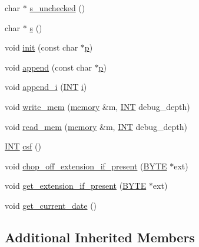 \begin{DoxyCompactItemize}
\item 
char $\ast$ \mbox{\hyperlink{classhollerith_a4b549f6a27d3d9d1c3d9b4eba91b5895}{s\+\_\+unchecked}} ()
\item 
char $\ast$ \mbox{\hyperlink{classhollerith_af61fce2d06f211b25fe3838e4dfee77a}{s}} ()
\item 
void \mbox{\hyperlink{classhollerith_af51ae7b943056db367f3c205a5a1cc4b}{init}} (const char $\ast$\mbox{\hyperlink{alphabet2_8_c_a533391314665d6bf1b5575e9a9cd8552}{p}})
\item 
void \mbox{\hyperlink{classhollerith_a778dd63885a4e3a4e2fb829165c32632}{append}} (const char $\ast$\mbox{\hyperlink{alphabet2_8_c_a533391314665d6bf1b5575e9a9cd8552}{p}})
\item 
void \mbox{\hyperlink{classhollerith_a5df988b4cf3eb66b5645115abeab5782}{append\+\_\+i}} (\mbox{\hyperlink{galois_8h_a09fddde158a3a20bd2dcadb609de11dc}{I\+NT}} \mbox{\hyperlink{alphabet2_8_c_acb559820d9ca11295b4500f179ef6392}{i}})
\item 
void \mbox{\hyperlink{classhollerith_a8d17739da6b15b91053f8356b824407d}{write\+\_\+mem}} (\mbox{\hyperlink{classmemory}{memory}} \&m, \mbox{\hyperlink{galois_8h_a09fddde158a3a20bd2dcadb609de11dc}{I\+NT}} debug\+\_\+depth)
\item 
void \mbox{\hyperlink{classhollerith_af6cbbe5728658ff3a71fc9fe331bb39f}{read\+\_\+mem}} (\mbox{\hyperlink{classmemory}{memory}} \&m, \mbox{\hyperlink{galois_8h_a09fddde158a3a20bd2dcadb609de11dc}{I\+NT}} debug\+\_\+depth)
\item 
\mbox{\hyperlink{galois_8h_a09fddde158a3a20bd2dcadb609de11dc}{I\+NT}} \mbox{\hyperlink{classhollerith_ac3e7f35e2c6d82a9825297577e1011ba}{csf}} ()
\item 
void \mbox{\hyperlink{classhollerith_a17d5710f02f7f230f2646497f5b267e7}{chop\+\_\+off\+\_\+extension\+\_\+if\+\_\+present}} (\mbox{\hyperlink{galois_8h_ab6cc7b4aeb6ea31aba2b3fbfc83ff5e6}{B\+Y\+TE}} $\ast$ext)
\item 
void \mbox{\hyperlink{classhollerith_a530576f22e7f0926918444cb4553f18d}{get\+\_\+extension\+\_\+if\+\_\+present}} (\mbox{\hyperlink{galois_8h_ab6cc7b4aeb6ea31aba2b3fbfc83ff5e6}{B\+Y\+TE}} $\ast$ext)
\item 
void \mbox{\hyperlink{classhollerith_a8564e42e7fff150a5d1182c82057743b}{get\+\_\+current\+\_\+date}} ()
\end{DoxyCompactItemize}
\subsection*{Additional Inherited Members}


